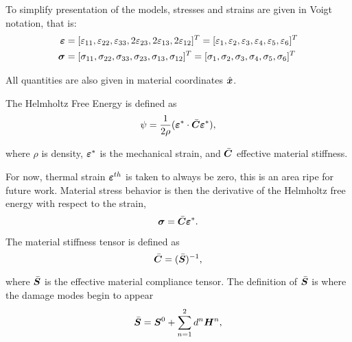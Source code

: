 \documentclass[11pt]{article}
\begin{document}
To simplify presentation of the models, stresses and strains are given
in Voigt notation, that is:
\begin{equation}
  \label{eq:VoigtStressStrain}
  \begin{split}
    \bm{\varepsilon} &= [\varepsilon_{11}, \varepsilon_{22}, \varepsilon_{33},
              2 \varepsilon_{23}, 2 \varepsilon_{13}, 2 \varepsilon_{12}]^T =
              [\varepsilon_{1}, \varepsilon_{2}, \varepsilon_{3},
                    \varepsilon_{4}, \varepsilon_{5}, \varepsilon_{6}]^T \\
    \bm{\sigma} &= [\sigma_{11}, \sigma_{22}, \sigma_{33},
              \sigma_{23}, \sigma_{13}, \sigma_{12}]^T =
              [\sigma_{1}, \sigma_{2}, \sigma_{3},
              \sigma_{4}, \sigma_{5}, \sigma_{6}]^T \\
  \end{split}
\end{equation}

All quantities are also given in material coordinates \(\hat{\bm{x}}\).

The Helmholtz Free Energy is defined as
\begin{equation}
  \label{eq:OpenDM_Helmholtz}
  \psi = \frac{1}{2 \rho}
  (\bm{\varepsilon}^* \cdot \bar{\bm{C}} \bm{\varepsilon}^*),
\end{equation}

where \(\rho\) is density, \(\bm{\varepsilon}^*\) is the mechanical strain,
and \(\bar{\bm{C}}\) effective material stiffness.

For now, thermal strain \(\bm{\varepsilon}^{th}\) is taken to always be
zero, this is an area ripe for future work. Material stress behavior
is then the derivative of the Helmholtz free energy with respect to
the strain,
\begin{equation}
  \label{eq:OpenDM_Stress}
  \bm{\sigma} = \bar{\bm{C}} \bm{\varepsilon}^*.
\end{equation}

The material stiffness tensor is defined as
\begin{equation}
  \label{eq:OpenDM_Stiffness}
  \bar{\bm{C}} = (\bar{\bm{S}})^{-1},
\end{equation}

where \(\bar{\bm{S}}\) is the effective material compliance
tensor. The definition of \(\bar{\bm{S}}\) is where the damage modes
begin to appear 
\begin{equation}
  \label{eq:OpenDM_EffCompliance}
  \bar{\bm{S}} = \bm{S}^0 + \sum_{n=1}^2 d^n \bm{H}^n,
\end{equation}
\end{document}
